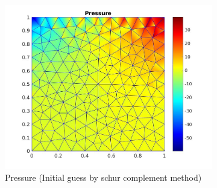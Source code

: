\documentclass[a4paper]{book}
\begin{document}
\begin{figure}
\begin{subfigure}{\textwidth}
  \includegraphics[width=\linewidth]{lid_newton_pressure_schur.jpg}
  \caption{Pressure (Initial guess by schur complement method)}
  \label{pressure_navier_stoke_schur_lid}
\end{subfigure}
\caption{\label{lid_driven_cavity_n_s_schur}}
\end{figure}
\end{document}
